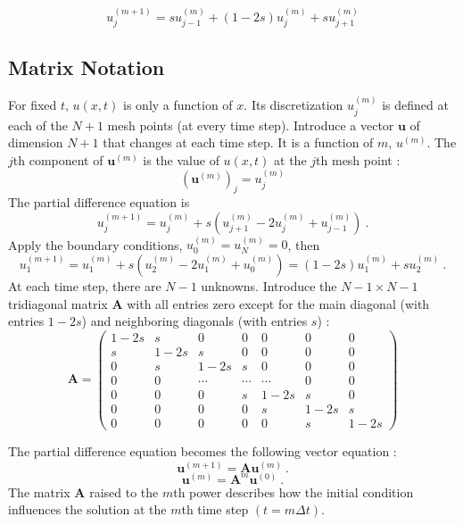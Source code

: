 \documentclass[12pt,a4paper]{article}
\renewcommand{\vec}[1]{\boldsymbol{#1}}
\begin{document}
\begin{equation}
u_j^{(m+1)} = s u_{j-1}^{(m)} +(1-2s)u_j^{(m)} +s u_{j+1}^{(m)}
\end{equation}

\subsection{Matrix Notation}
For fixed $t$, $u(x,t)$ is only a function of $x$. Its discretization $u_j^{(m)}$ is defined at each of the $N+1$ mesh points (at every time step). Introduce a vector $\vec{u}$ of dimension $N+1$ that changes at each time step. It is a function of $m$, $u^{(m)}$. The $j$th component of $\vec{u}^{(m)}$ is the value of $u(x,t)$ at the $j$th mesh point :
\begin{equation}
\left(\vec{u}^{(m)} \right)_j = u_j^{(m)}
\end{equation}
The partial difference equation is
\begin{equation}
u_j^{(m+1)}  = u_j^{(m)}  +s\left(u_{j+1}^{(m)} -2u_j^{(m)} +u_{j-1}^{(m)} \right) ~.
\end{equation}
Apply  the boundary conditions, $u_0^{(m)}=u_N^{(m)}=0$, then 
\begin{equation}
u_1^{(m+1)}  = u_1^{(m)}  +s\left(u_{2}^{(m)} -2u_1^{(m)} +u_{0}^{(m)} \right) = (1-2s)u_1^{(m)} +su_2^{(m)} ~.
\end{equation}
At each time step, there are $N-1$ unknowns. Introduce the $N-1 \times N-1$ tridiagonal matrix $\vec{A}$ with all entries zero except for the main diagonal (with entries $1-2s$) and neighboring diagonals (with entries $s$) : 
\begin{equation}
\vec{A} = \begin{pmatrix} 
1-2s & s & 0 & 0 & 0 & 0 & 0 \\ 
s & 1-2s & s & 0 & 0 & 0 & 0 \\
0 & s & 1-2s & s & 0 & 0 & 0 \\
0 & 0 & \cdots & \cdots & \cdots & 0 & 0 \\
0 & 0 & 0 & s & 1-2s & s & 0 \\
0 & 0 & 0 & 0 & s & 1-2s & s \\
0 & 0 & 0 & 0 & 0 & s & 1-2s
\end{pmatrix}
\end{equation}


The partial difference equation becomes the following vector equation :
\begin{equation}
\vec{u}^{(m+1)} = \vec{A} \vec{u}^{(m)} ~.
\end{equation}
\begin{equation}
\vec{u}^{(m)} = \vec{A}^m \vec{u}^{(0)} ~.
\end{equation}
The matrix $\vec{A}$ raised to the $m$th power describes how the initial condition influences the solution at the $m$th time step $(t=m \Delta t)$.
\end{document}
